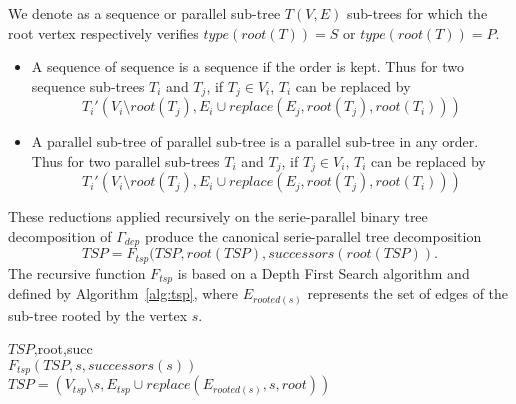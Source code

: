 \begin{mydef}
We denote as a sequence or parallel sub-tree $T(V,E)$ sub-trees for which the root vertex respectively verifies $type(root(T))=S$ or $type(root(T))=P$.
\end{mydef}

\begin{myth}
\begin{itemize}
\item A sequence of sequence is a sequence if the order is kept. Thus for two sequence sub-trees $T_i$ and $T_j$, if $T_j \in V_i$, $T_i$ can be replaced by 
\begin{equation*}
T_i'(V_i \setminus root(T_j),E_i \cup replace(E_j,root(T_j),root(T_i)))
\end{equation*}
\item A parallel sub-tree of parallel sub-tree is a parallel sub-tree in any order. Thus for two parallel sub-trees $T_i$ and $T_j$, if $T_j \in V_i$, $T_i$ can be replaced by 
\begin{equation*}
T_i'(V_i \setminus root(T_j),E_i \cup replace(E_j,root(T_j),root(T_i)))
\end{equation*}
\end{itemize}
\end{myth}

These reductions applied recursively on the serie-parallel binary tree decomposition of $\Gamma_{dep}$ produce the canonical serie-parallel tree decomposition 
\begin{equation*}
TSP = F_{tsp}(TSP,root(TSP),successors(root(TSP)).
\end{equation*}
The recursive function $F_{tsp}$ is based on a Depth First Search algorithm and defined by Algorithm~\ref{alg:tsp}, where $E_{rooted(s)}$ represents the set of edges of the sub-tree rooted by the vertex $s$.

\begin{algorithm}
\caption{$F_{tsp}$}
\label{alg:tsp}
\begin{algorithmic}[1]
 {$TSP$,root,succ}
\\$F_{tsp}(TSP,s,successors(s))$
\\$TSP = (V_{tsp} \setminus s,E_{tsp} \cup replace(E_{rooted(s)},s,root))$
\EndIf
\EndIf
\EndFor
\EndProcedure
\end{algorithmic}
\end{algorithm}

